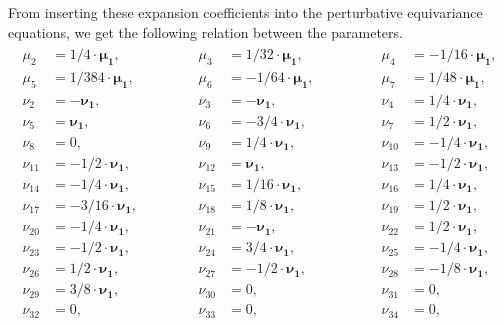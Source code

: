 \documentclass[a4paper,12pt, DIV=14, BCOR=5mm, twoside, headsepline, numbers=noenddot]{scrbook}
\begin{document}
From inserting these expansion coefficients into the perturbative equivariance equations, we get the following relation between the parameters.
\begin{align}\label{GRSol}
\begin{alignedat}{3}
\mu_{{2}} &= 1/4\cdot \boldsymbol{\mu_1} , \hspace{2cm}    &  \mu_{{3}}   &= 1/32\cdot \boldsymbol{\mu_1} , \hspace{2cm}   & \mu_{{4}}   &= -1/16\cdot  \boldsymbol{\mu_1} , \\
%
\mu_{{5}} &= 1/384\cdot \boldsymbol{\mu_1} ,  &  \mu_{{6}}   &= -1/64\cdot \boldsymbol{\mu_1} ,  & \mu_{{7}}   &= 1/48\cdot \boldsymbol{\mu_1} , \\
%
\nu_{{2}} &= - \boldsymbol{\nu_1} ,  & \nu_{{3}}   &= - \boldsymbol{\nu_1} ,  & \nu_{{4}}   &= 1/4\cdot \boldsymbol{\nu_1} , \\
%
\nu_{{5}} &= \boldsymbol{\nu_1} ,  & \nu_{{6}}   &= -3/4 \cdot  \boldsymbol{\nu_1} ,   & \nu_{{7}}    &= 1/2\cdot \boldsymbol{\nu_1} , \\
%
\nu_{{8}} &=  0 ,  & \nu_{{9}}   &= 1/4\cdot \boldsymbol{\nu_1} ,   & \nu_{{10}}    &= -1/4 \cdot  \boldsymbol{\nu_1} , \\
%
\nu_{{11}} &= -1/2\cdot \boldsymbol{\nu_1} ,  &  \nu_{{12}}   &= \boldsymbol{\nu_1} ,   & \nu_{{13}}    &= -1/2\cdot \boldsymbol{\nu_1} , \\
%
\nu_{{14}} &= -1/4\cdot \boldsymbol{\nu_1} ,  &  \nu_{{15}}   &= 1/16\cdot \boldsymbol{\nu_1} ,   & \nu_{{16}}    &= 1/4\cdot \boldsymbol{\nu_1} , \\
%
\nu_{{17}} &= -3/16\cdot \boldsymbol{\nu_1} ,  &  \nu_{{18}}   &= 1/8\cdot \boldsymbol{\nu_1} ,   & \nu_{{19}}    &= 1/2\cdot \boldsymbol{\nu_1} , \\
%
\nu_{{20}} &= -1/4\cdot \boldsymbol{\nu_1} ,  & \nu_{{21}}   &= - \boldsymbol{\nu_1} ,   & \nu_{{22}}    &= 1/2\cdot \boldsymbol{\nu_1} , \\
%
\nu_{{23}} &= -1/2\cdot \boldsymbol{\nu_1} ,  & \nu_{{24}}   &= 3/4\cdot \boldsymbol{\nu_1} ,   & \nu_{{25}}    &= -1/4\cdot \boldsymbol{\nu_1} , \\
%
\nu_{{26}} &= 1/2\cdot \boldsymbol{\nu_1} ,  & \nu_{{27}}   &= -1/2\cdot \boldsymbol{\nu_1} ,   & \nu_{{28}}    &= -1/8\cdot \boldsymbol{\nu_1} , \\
%
\nu_{{29}} &= 3/8\cdot \boldsymbol{\nu_1} ,  & \nu_{{30}}   &=0 ,   & \nu_{{31}}    &= 0 , \\
%
\nu_{{32}} &= 0 ,  & \nu_{{33}}   &= 0 ,   &  \nu_{{34}}    &=  0 , \\

\end{alignedat}
\end{align}
\end{document}
